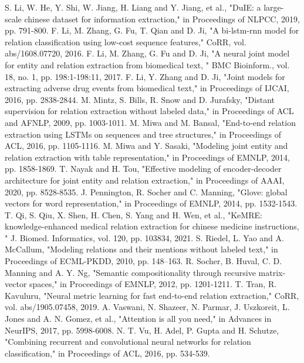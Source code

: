 \documentclass[conference]{IEEEtran}
\begin{document}
\begin{thebibliography}{00}
 S. Li, W. He, Y. Shi, W. Jiang, H. Liang and Y. Jiang, et al., "DuIE: a large-scale chinese dataset for information extraction," in Proceedings of NLPCC, 2019, pp. 791-800.
 F. Li, M. Zhang, G. Fu, T. Qian and D. Ji, "A bi-lstm-rnn model for relation classification using low-cost sequence features," CoRR, vol. abs/1608.07720, 2016.
 F. Li, M. Zhang, G. Fu and D. Ji, "A neural joint model for entity and relation extraction from biomedical text, " BMC Bioinform., vol. 18, no. 1, pp. 198:1-198:11, 2017.
 F. Li, Y. Zhang and D. Ji, "Joint models for extracting adverse drug events from biomedical text," in Proceedings of IJCAI, 2016, pp. 2838-2844.
 M. Mintz, S. Bills, R. Snow and D. Jurafsky, "Distant supervision for relation extraction without labeled data," in Proceedings of ACL and AFNLP, 2009, pp. 1003-1011.
 M. Miwa and M. Bansal, "End-to-end relation extraction using LSTMs on sequences and tree structures," in Proceedings of ACL, 2016, pp. 1105-1116.
 M. Miwa and Y. Sasaki, "Modeling joint entity and relation extraction with table representation," in Proceedings of EMNLP, 2014, pp. 1858-1869.
 T. Nayak and H. Tou, "Effective modeling of encoder-decoder architecture for joint entity and relation extraction," in Proceedings of AAAI, 2020, pp. 8528-8535.
 J. Pennington, R. Socher and C. Manning, "Glove: global vectors for word representation," in Proceedings of EMNLP, 2014, pp. 1532-1543.
 T. Qi, S. Qiu, X. Shen, H. Chen, S. Yang and H. Wen, et al., "KeMRE: knowledge-enhanced medical relation extraction for chinese medicine instructions, " J. Biomed. Informatics, vol. 120, pp. 103834, 2021.
 S. Riedel, L. Yao and A. McCallum, "Modeling relations and their mentions without labeled text," in Proceedings of ECML-PKDD, 2010, pp. 148–163.
 R. Socher, B. Huval, C. D. Manning and A. Y. Ng, "Semantic compositionality through recursive matrix-vector spaces," in Proceedings of EMNLP, 2012, pp. 1201-1211.
 T. Tran, R. Kavuluru, "Neural metric learning for fast end-to-end relation extraction," CoRR, vol. abs/1905.07458, 2019.
 A. Vaswani, N. Shazeer, N. Parmar, J. Uszkoreit, L. Jones and A. N. Gomez, et al., "Attention is all you need," in Advances in NeurIPS, 2017, pp. 5998-6008.
 N. T. Vu, H. Adel, P. Gupta and H. Schutze, "Combining recurrent and convolutional neural networks for relation classification," in Proceedings of ACL, 2016, pp. 534-539.

\end{thebibliography}
\end{document}
